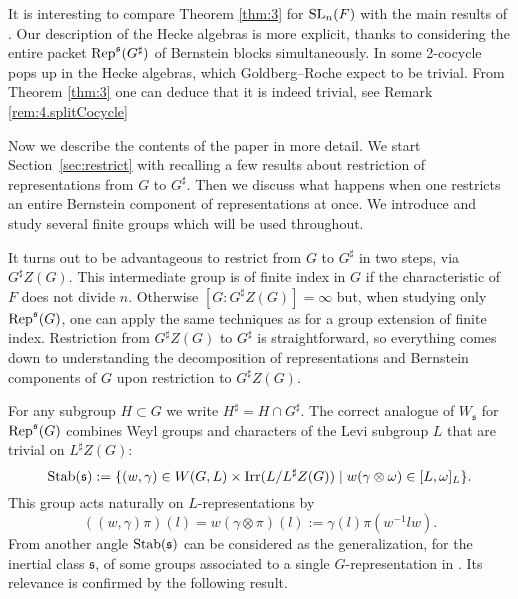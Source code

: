 \documentclass[11pt]{amsart}
\theoremstyle{definition}
\begin{document}
It is interesting to compare Theorem \ref{thm:3} for ${{\rm SL}}_n (F)$ with
the main results of \cite{GoRo2}. Our description of the Hecke algebras is more explicit,
thanks to considering the entire packet ${{\rm Rep}}^{{\mathfrak s}} (G^\sharp)$ of Bernstein blocks 
simultaneously. In \cite[\S 11]{GoRo2} some 2-cocycle pops up in the Hecke algebras,
which Goldberg--Roche expect to be trivial. From Theorem \ref{thm:3} one can deduce 
that it is indeed trivial, see Remark \ref{rem:4.splitCocycle}

\medskip

Now we describe the contents of the paper in more detail.
We start Section~\ref{sec:restrict} with recalling a few results about restriction of 
representations from $G$ to $G^\sharp$. Then we discuss what happens when one restricts 
an entire Bernstein component of representations at once. We introduce and study several 
finite groups which will be used throughout.

It turns out to be advantageous to restrict from $G$ to $G^\sharp$ in two steps, via 
$G^\sharp Z(G)$. This intermediate group is of finite index in $G$ if the characteristic of
$F$ does not divide $n$. Otherwise $[G : G^\sharp Z(G)] = \infty$ but, when studying only
${{\rm Rep}}^{{\mathfrak s}} (G)$, one can apply the same techniques as for a group extension of finite index.
Restriction from $G^\sharp Z(G)$ to $G^\sharp$ is straightforward, so everything comes down
to understanding the decomposition of representations and Bernstein components of $G$ upon
restriction to $G^\sharp Z(G)$.

For any subgroup $H \subset G$ we write $H^\sharp = H \cap G^\sharp$. The correct analogue
of $W_{{\mathfrak s}}$ for ${{\rm Rep}}^{{\mathfrak s}} (G)$ combines Weyl groups and characters of the Levi subgroup $L$
that are trivial on $L^\sharp Z(G)$:
\[
{{\rm Stab}} ({{\mathfrak s}}) := \{ (w,\gamma) \in W(G,L) \times {{\rm Irr}} (L / L^\sharp Z(G)) \mid
w (\gamma \otimes \omega) \in [L,\omega]_L \} .
\]
This group acts naturally on $L$-representations by
\[
((w,\gamma)\pi) (l) = w(\gamma \otimes \pi) (l) := \gamma (l) \pi (w^{-1} l w).
\]
From another angle ${{\rm Stab}} ({{\mathfrak s}})$ can be considered as the generalization, for the
inertial class ${{\mathfrak s}}$, of some groups associated to a single $G$-representation in 
\cite{ChLi,ChGo}. Its relevance is confirmed by the following result.
\end{document}
